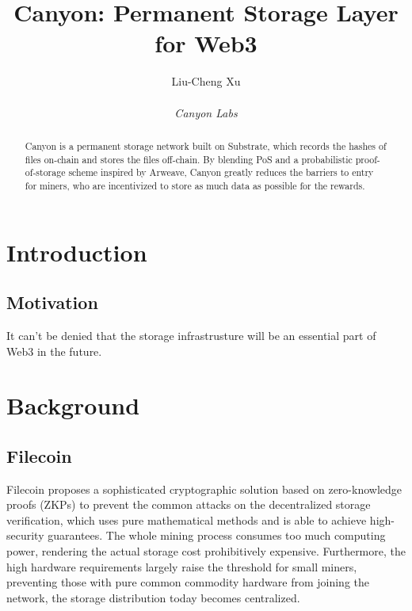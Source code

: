 \documentclass[]{article}
\title{Canyon: Permanent Storage Layer for Web3}
\author{
    Liu-Cheng Xu\\
    \\
    \textit{Canyon Labs}
}
\date{}
\begin{document}
\maketitle

\begin{abstract}

Canyon is a permanent storage network built on Substrate, which records the hashes of files on-chain and stores the files off-chain. By blending PoS and a probabilistic proof-of-storage scheme inspired by Arweave, Canyon greatly reduces the barriers to entry for miners, who are incentivized to store as much data as possible for the rewards.

\end{abstract}

\tableofcontents

\newpage

\section{Introduction}

\subsection{Motivation}

It can't be denied that the storage infrastrusture will be an essential part of Web3 in the future.



\section{Background}

\subsection{Filecoin}

Filecoin\cite{ref1} proposes a sophisticated cryptographic solution based on zero-knowledge proofs (ZKPs) to prevent the common attacks on the decentralized storage verification, which uses pure mathematical methods and is able to achieve high-security guarantees. The whole mining process consumes too much computing power, rendering the actual storage cost prohibitively expensive. Furthermore, the high hardware requirements largely raise the threshold for small miners, preventing those with pure common commodity hardware from joining the network, the storage distribution today becomes centralized.
\end{document}
